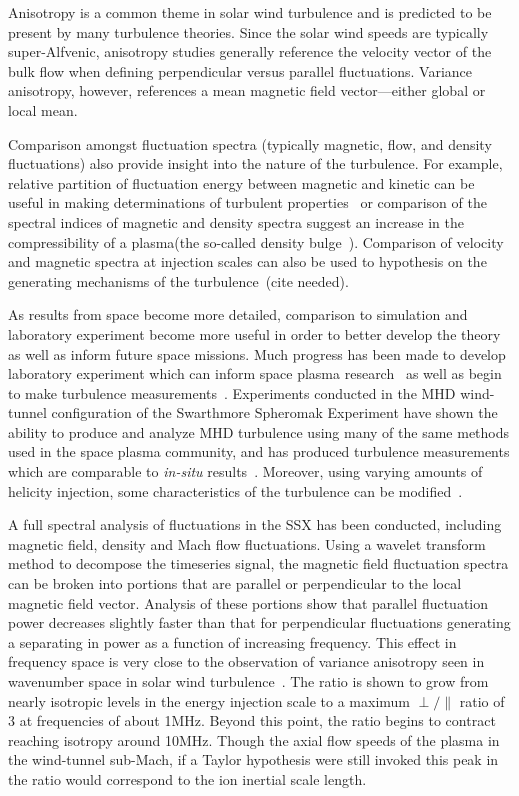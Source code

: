 \documentclass[aip,prl,amsmath,amssymb,reprint,superscriptaddress]{revtex4-1} %
\begin{document}
Anisotropy is a common theme in solar wind turbulence and is predicted to be present by many turbulence theories. Since the solar wind speeds are typically super-Alfvenic, anisotropy studies generally reference the velocity vector of the bulk flow when defining perpendicular versus parallel fluctuations. Variance anisotropy, however, references a mean magnetic field vector---either global or local mean.

Comparison amongst fluctuation spectra (typically magnetic, flow, and density fluctuations) also provide insight into the nature of the turbulence. For example, relative partition of fluctuation energy between magnetic and kinetic can be useful in making determinations of turbulent properties~\cite{podesta07} or comparison of the spectral indices of magnetic and density spectra suggest an increase in the compressibility of a plasma(the so-called density bulge~\cite{harmon05}). Comparison of velocity and magnetic spectra at injection scales can also be used to hypothesis on the generating mechanisms of the turbulence~\cite{}(cite needed).

As results from space become more detailed, comparison to simulation and laboratory experiment become more useful in order to better develop the theory as well as inform future space missions. Much progress has been made to develop laboratory experiment which can inform space plasma research~\cite{howes12a} as well as begin to make turbulence measurements~\cite{ren11}.  Experiments conducted in the MHD wind-tunnel configuration of the Swarthmore Spheromak Experiment have shown the ability to produce and analyze MHD turbulence using many of the same methods used in the space plasma community, and has produced turbulence measurements which are comparable to \textit{in-situ} results~\cite{schaffner14a}. Moreover, using varying amounts of helicity injection, some characteristics of the turbulence can be modified~\cite{schaffner14b}.

A full spectral analysis of fluctuations in the SSX has been conducted, including magnetic field, density and Mach flow fluctuations. Using a wavelet transform method to decompose the timeseries signal, the magnetic field fluctuation spectra can be broken into portions that are parallel or perpendicular to the local magnetic field vector. Analysis of these portions show that parallel fluctuation power decreases slightly faster than that for perpendicular fluctuations generating a separating in power as a function of increasing frequency. This effect in frequency space is very close to the observation of variance anisotropy seen in wavenumber space in solar wind turbulence~\cite{kiyani13}. The ratio is shown to grow from nearly isotropic levels in the energy injection scale to a maximum $\perp/\parallel$ ratio of 3 at frequencies of about 1MHz. Beyond this point, the ratio begins to contract reaching isotropy around 10MHz. Though the axial flow speeds of the plasma in the wind-tunnel sub-Mach, if a Taylor hypothesis were still invoked this peak in the ratio would correspond to the ion inertial scale length. 
\end{document}
